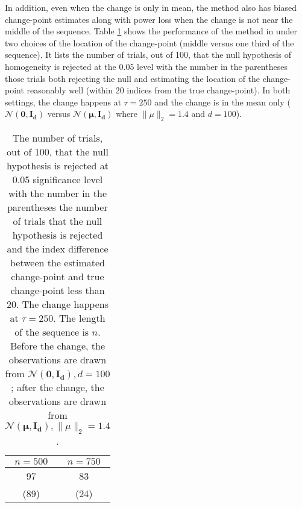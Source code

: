 \documentclass[arxiv, preprint]{imsart}
\numberwithin{equation}{section}
\theoremstyle{plain}
\begin{document}

In addition, even when the change is only in mean, the method also has biased change-point estimates along with power loss when the change is not near the middle of the sequence. Table \ref{table:power_example} shows the performance of the method in \cite{chen2015graph} under two choices of the location of the change-point (middle versus one third of the sequence).  It lists the number of trials, out of 100, that the null hypothesis of homogeneity is rejected at the $0.05$ level with the number in the parentheses those trials both rejecting the null and estimating the location of the change-point reasonably well (within 20 indices from the true change-point).   In both settings, the change happens at $\tau=250$ and the change is in the mean only ($\mathcal{N}(\mathbf{0},\mathbf{I_d})$ versus $\mathcal{N}(\mathbf{\mu},\mathbf{I_d})$ where $\|\mu\|_2 = 1.4$ and $d=100$).  

\begin{table}[!htp] 
\caption{The number of trials, out of 100, that the null hypothesis is rejected at 0.05 significance level with the number in the parentheses the number of trials that the null hypothesis is rejected and the index difference between the estimated change-point and true change-point less than 20.   The change happens at $\tau=250$.  The length of the sequence is $n$.  Before the change, the observations are drawn from $\mathcal{N}(\mathbf{0},\mathbf{I_d}), d=100$; after the change, the observations are drawn from $\mathcal{N}(\mathbf{\mu},\mathbf{I_d}), \|\mu\|_2=1.4$.  }

\begin{center}
\begin{tabular}{cc}
\hline
\hline
         $n = 500$  & $n = 750$ \\
\hline
\hline
  97 & 83 \\
       (89) & (24) \\
\hline
\hline
\end{tabular}
\end{center}
\label{table:power_example}
\end{table}
\end{document}
